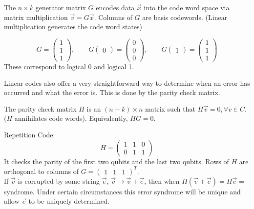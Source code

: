 \begin{definition}
    The $n \times k$ generator matrix $G$ encodes data $\Vec{x}$ into the code word space via matrix multiplication $\Vec{v} = G\Vec{x}$. Columns of $G$ are basis codewords. (Linear multiplication generates the code word states)
\end{definition}
\begin{example}
    \begin{equation}
        G = \begin{pmatrix}
            1 \\ 1 \\ 1
        \end{pmatrix}, \qquad G \begin{pmatrix}
            0
        \end{pmatrix} = \begin{pmatrix}
            0 \\ 0 \\ 0
        \end{pmatrix}, \qquad  G \begin{pmatrix}
            1
        \end{pmatrix} = \begin{pmatrix}
            1 \\ 1 \\ 1
        \end{pmatrix}
    \end{equation}
    These correspond to logical 0 and logical 1. 
\end{example}
Linear codes also offer a very straightforward way to determine when an error has occurred and what the error is. This is done by the parity check matrix. 
\begin{definition}
    The parity check matrix $H$ is an $(n-k) \times n$ matrix such that $H \vec{v} = 0, \forall v \in C$. ($H$ annihilates code words). Equivalently, $HG= 0$. 
\end{definition}
\begin{example}
    Repetition Code:
    \begin{equation}
        H = \begin{pmatrix}
            1 & 1 & 0 \\ 0 & 1 & 1
        \end{pmatrix}
    \end{equation}
    It checks the parity of the first two qubits and the last two qubits. Rows of $H$ are orthogonal to columns of $G = \begin{pmatrix}1 & 1 & 1 \end{pmatrix}^T$. \\
    If $\vec{v}$ is corrupted by some string $\vec{e}$, $\vec{v} \rightarrow \vec{v} + \vec{e}$, then when $H (\vec{v} + \vec{e})= H \vec{e} = $ syndrome. Under certain circumstances this error syndrome will be unique and allow $\vec{e}$ to be uniquely determined. 
\end{example}
